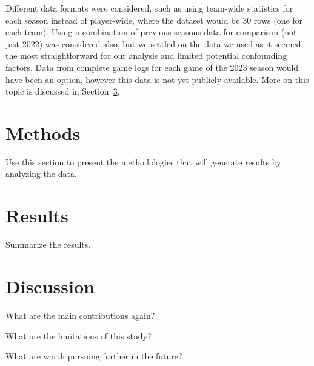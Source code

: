 \documentclass[12pt]{article}
\begin{document}
Different data formats were considered, such as using team-wide statistics
for each season instead of player-wide, where the dataset would be 30 rows (one
for each team). Using a combination of previous seasons data for comparison (not
just 2022) was considered also, but we settled on the data we used as it seemed
the most straightforward for our analysis and limited potential confounding
factors. Data from complete game logs for each game of the 2023 season would have
been an option, however this data is not yet publicly available. More on this topic
is discussed in Section~\ref{sec:disc}.




\section{Methods}
\label{sec:meth}

Use this section to present the methodologies that will generate results by
analyzing the data.


\section{Results}
\label{sec:resu}

Summarize the results.


\section{Discussion}
\label{sec:disc}

What are the main contributions again?

What are the limitations of this study?

What are worth pursuing further in the future?




\end{document}

